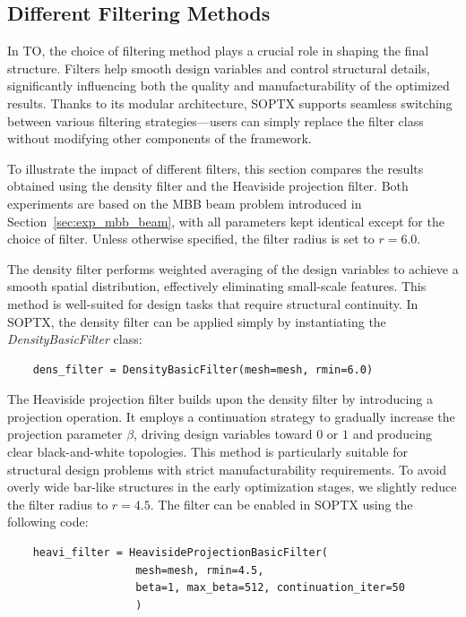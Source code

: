 \documentclass[mathpazo]{cicp}
\begin{document}
\subsection{Different Filtering Methods}
In TO, the choice of filtering method plays a crucial role in shaping the final structure. Filters help smooth design variables and control structural details, significantly influencing both the quality and manufacturability of the optimized results. Thanks to its modular architecture, SOPTX supports seamless switching between various filtering strategies---users can simply replace the filter class without modifying other components of the framework.

To illustrate the impact of different filters, this section compares the results obtained using the density filter and the Heaviside projection filter. Both experiments are based on the MBB beam problem introduced in Section~\ref{sec:exp_mbb_beam}, with all parameters kept identical except for the choice of filter. Unless otherwise specified, the filter radius is set to $r=6.0$.

The density filter performs weighted averaging of the design variables to achieve a smooth spatial distribution, effectively eliminating small-scale features. This method is well-suited for design tasks that require structural continuity. In SOPTX, the density filter can be applied simply by instantiating the \textit{DensityBasicFilter} class:
\begin{lstlisting}
	dens_filter = DensityBasicFilter(mesh=mesh, rmin=6.0)
\end{lstlisting}

The Heaviside projection filter builds upon the density filter by introducing a projection operation. It employs a continuation strategy to gradually increase the projection parameter $\beta$, driving design variables toward $0$ or $1$ and producing clear black-and-white topologies. This method is particularly suitable for structural design problems with strict manufacturability requirements. To avoid overly wide bar-like structures in the early optimization stages, we slightly reduce the filter radius to $r=4.5$. The filter can be enabled in SOPTX using the following code:
\begin{lstlisting}
	heavi_filter = HeavisideProjectionBasicFilter(
					mesh=mesh, rmin=4.5, 
					beta=1, max_beta=512, continuation_iter=50
					)   
\end{lstlisting}
\end{document}
